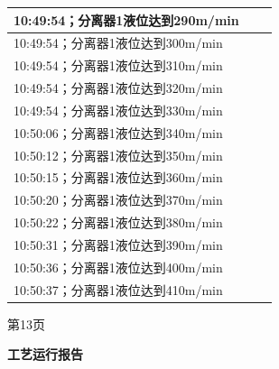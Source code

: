\documentclass[UTF8,10pt,a4paper,fontset=fandol]{ctexart}
\newcommand{\fieldvalue}[1]{#1}
\begin{document}
\begin{center}
\begin{minipage}[t]{0.47\linewidth}
\begin{tabular}{|p{0.18\linewidth}|p{0.72\linewidth}|}
\multicolumn{2}{|l|}{
\fieldvalue{10:49:54；分离器1液位达到290m/min}} \\ \hline
\multicolumn{2}{|l|}{
\fieldvalue{10:49:54；分离器1液位达到300m/min}} \\ \hline
\multicolumn{2}{|l|}{
\fieldvalue{10:49:54；分离器1液位达到310m/min}} \\ \hline
\multicolumn{2}{|l|}{
\fieldvalue{10:49:54；分离器1液位达到320m/min}} \\ \hline
\multicolumn{2}{|l|}{
\fieldvalue{10:49:54；分离器1液位达到330m/min}} \\ \hline
\multicolumn{2}{|l|}{
\fieldvalue{10:50:06；分离器1液位达到340m/min}} \\ \hline
\multicolumn{2}{|l|}{
\fieldvalue{10:50:12；分离器1液位达到350m/min}} \\ \hline
\multicolumn{2}{|l|}{
\fieldvalue{10:50:15；分离器1液位达到360m/min}} \\ \hline
\multicolumn{2}{|l|}{
\fieldvalue{10:50:20；分离器1液位达到370m/min}} \\ \hline
\multicolumn{2}{|l|}{
\fieldvalue{10:50:22；分离器1液位达到380m/min}} \\ \hline
\multicolumn{2}{|l|}{
\fieldvalue{10:50:31；分离器1液位达到390m/min}} \\ \hline
\multicolumn{2}{|l|}{
\fieldvalue{10:50:36；分离器1液位达到400m/min}} \\ \hline
\multicolumn{2}{|l|}{
\fieldvalue{10:50:37；分离器1液位达到410m/min}} \\ \hline
\end{tabular}

\vspace{1mm}
第13页
\end{minipage}
\hfill
\begin{minipage}[t]{0.47\linewidth}
\centering
\textbf{工艺运行报告}


\end{minipage}
\end{center}
\end{document}
